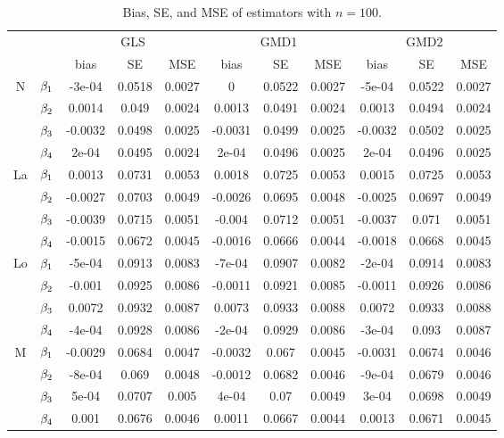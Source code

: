 \begin{table}[htbp!]
\begin{center}
\begin{tabular}{c  c c c  c c c  c c c  c }
\hline
 &  & \multicolumn{3}{c}{GLS} & \multicolumn{3}{c}{GMD1} & \multicolumn{3}{c}{GMD2} \\
\cline{3-11}
 &  &  bias & SE & MSE & bias  & SE & MSE & bias & SE & MSE\\
\hline
\multirow{3}{*}{N}& $\beta_{1}$&-3e-04  &0.0518 &0.0027 &0       &0.0522 &0.0027 &-5e-04  &0.0522 &0.0027\\
& $\beta_{2}$&0.0014  &0.049  &0.0024 &0.0013  &0.0491 &0.0024 &0.0013  &0.0494 &0.0024\\
& $\beta_{3}$&-0.0032 &0.0498 &0.0025 &-0.0031 &0.0499 &0.0025 &-0.0032 &0.0502 &0.0025\\
& $\beta_{4}$&2e-04   &0.0495 &0.0024 &2e-04   &0.0496 &0.0025 &2e-04   &0.0496 &0.0025\\
\hline
\multirow{3}{*}{La} &$\beta_{1}$&0.0013  &0.0731 &0.0053 &0.0018  &0.0725 &0.0053 &0.0015  &0.0725 &0.0053\\
&$\beta_{2}$&-0.0027 &0.0703 &0.0049 &-0.0026 &0.0695 &0.0048 &-0.0025 &0.0697 &0.0049\\
&$\beta_{3}$&-0.0039 &0.0715 &0.0051 &-0.004  &0.0712 &0.0051 &-0.0037 &0.071  &0.0051\\
&$\beta_{4}$&-0.0015 &0.0672 &0.0045 &-0.0016 &0.0666 &0.0044 &-0.0018 &0.0668 &0.0045\\
\hline
\multirow{3}{*}{Lo} &$\beta_{1}$&-5e-04 &0.0913 &0.0083 &-7e-04  &0.0907 &0.0082 &-2e-04  &0.0914 &0.0083\\
&$\beta_{2}$&-0.001 &0.0925 &0.0086 &-0.0011 &0.0921 &0.0085 &-0.0011 &0.0926 &0.0086\\
&$\beta_{3}$&0.0072 &0.0932 &0.0087 &0.0073  &0.0933 &0.0088 &0.0072  &0.0933 &0.0088\\
&$\beta_{4}$&-4e-04 &0.0928 &0.0086 &-2e-04  &0.0929 &0.0086 &-3e-04  &0.093  &0.0087\\
\hline
\multirow{3}{*}{M}  &$\beta_{1}$&-0.0029 &0.0684 &0.0047 &-0.0032 &0.067  &0.0045 &-0.0031 &0.0674 &0.0046\\
&$\beta_{2}$&-8e-04  &0.069  &0.0048 &-0.0012 &0.0682 &0.0046 &-9e-04  &0.0679 &0.0046\\
&$\beta_{3}$&5e-04   &0.0707 &0.005  &4e-04   &0.07   &0.0049 &3e-04   &0.0698 &0.0049\\
&$\beta_{4}$&0.001   &0.0676 &0.0046 &0.0011  &0.0667 &0.0044 &0.0013  &0.0671 &0.0045\\
\hline
\end{tabular}
\end{center}
\caption{Bias, SE, and MSE of estimators with $n=100$.}
\end{table}



